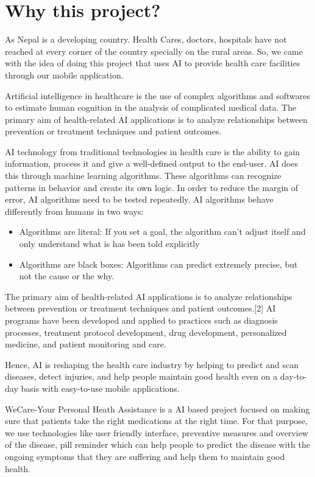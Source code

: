 \section{Why this project?}
As Nepal is a developing country. Health Cares, doctors, hospitals have not reached at every corner of the country specially on the rural areas. So, we came with the idea of doing this project that uses AI to provide health care facilities through our mobile application.\par  
Artificial intelligence in healthcare is the use of complex algorithms and softwares to estimate human cognition in the analysis of complicated medical data. The primary aim of health-related AI applications is to analyze relationships between prevention or treatment techniques and patient outcomes.\par
AI technology from traditional technologies in health care is the ability to gain information, process it and give a well-defined output to the end-user. AI does this through machine learning algorithms. These algorithms can recognize patterns in behavior and create its own logic. In order to reduce the margin of error, AI algorithms need to be tested repeatedly. AI algorithms behave differently from humans in two ways: 
\begin{itemize}
    \item Algorithms are literal: If you set a goal, the algorithm can't adjust itself and only understand what is has been told explicitly
    \item Algorithms are black boxes: Algorithms can predict extremely precise, but not the cause or the why.
\end{itemize}
The primary aim of health-related AI applications is to analyze relationships between prevention or treatment techniques and patient outcomes.[2] AI programs have been developed and applied to practices such as diagnosis processes, treatment protocol development, drug development, personalized medicine, and patient monitoring and care.\par
Hence, AI is reshaping the health care industry by helping to predict and scan diseases, detect injuries, and help people maintain good health even on a day-to-day basis with easy-to-use mobile applications.

WeCare-Your Personal Heath Assistance is a AI based project focused on making sure that patients take the right medications at the right time. For that purpose, we use technologies like user friendly interface, preventive measures and overview of the disease, pill reminder which can help people to predict the disease with the ongoing symptoms that they are suffering and help them to maintain good health.





